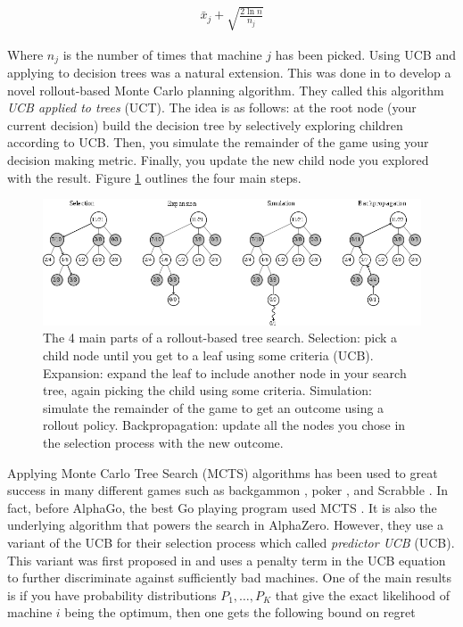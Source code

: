 \documentclass{article}
\begin{document}
  \begin{gather*}
    \bar{x}_j + \sqrt{\frac{2 \ln n}{n_j}}
  \end{gather*}

  Where $n_j$ is the number of times that machine $j$ has been picked. Using UCB and applying to decision trees was a natural extension. This was done in \cite{kocsis_bandit_2006} to develop a novel rollout-based Monte Carlo planning algorithm. They called this algorithm \textit{UCB applied to trees} (UCT). The idea is as follows: at the root node (your current decision) build the decision tree by selectively exploring children according to UCB. Then, you simulate the remainder of the game using your decision making metric. Finally, you update the new child node you explored with the result. Figure \ref{fig:mcts} outlines the four main steps.

  \begin{figure}[H]
    \centering
      \includegraphics[width=\textwidth]{mcts}
    \caption[Diagram of general MCTS algorithm]{The 4 main parts of a rollout-based tree search. Selection: pick a child node until you get to a leaf using some criteria (UCB). Expansion: expand the leaf to include another node in your search tree, again picking the child using some criteria. Simulation: simulate the remainder of the game to get an outcome using a rollout policy. Backpropagation: update all the nodes you chose in the selection process with the new outcome.}
    \label{fig:mcts}
  \end{figure}

  Applying Monte Carlo Tree Search (MCTS) algorithms has been used to great success in many different games such as backgammon \cite{tesauro_-line_1997}, poker \cite{billings_challenge_2002}, and Scrabble \cite{sheppard_world-championship-caliber_2002}. In fact, before AlphaGo, the best Go playing program used MCTS \cite{browne_survey_2012}. It is also the underlying algorithm that powers the search in AlphaZero. However, they use a variant of the UCB for their selection process which called \textit{predictor UCB} (UCB). This variant was first proposed in \cite{rosin_multi-armed_2011} and uses a penalty term in the UCB equation to further discriminate against sufficiently bad machines. One of the main results is if you have probability distributions $P_1, \dots, P_K$ that give the exact likelihood of machine $i$ being the optimum, then one gets the following bound on regret
\end{document}
